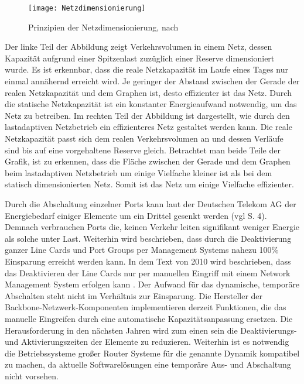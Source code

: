 \begin{figure}[!ht]
	\centering
	\texttt{[image: Netzdimensionierung]}
	\caption{Prinzipien der Netzdimensionierung, nach \cite{fisher}}
	\label{fig:Netzdimensionierung}
\end{figure}

Der linke Teil der Abbildung zeigt Verkehrsvolumen in einem Netz, dessen Kapazität aufgrund einer Spitzenlast zuzüglich einer Reserve dimensioniert wurde. Es ist erkennbar, dass die reale Netzkapazität im Laufe eines Tages nur einmal annähernd erreicht wird. Je geringer der Abstand zwischen der Gerade der realen Netzkapazität und dem Graphen ist, desto effizienter ist das Netz. Durch die statische Netzkapazität ist ein konstanter Energieaufwand notwendig, um das Netz zu betreiben. Im rechten Teil der Abbildung ist dargestellt, wie durch den lastadaptiven Netzbetrieb ein effizienteres Netz gestaltet werden kann. Die reale Netzkapazität passt sich dem realen Verkehrsvolumen an und dessen Verläufe sind bis auf eine vorgehaltene Reserve gleich. Betrachtet man beide Teile der Grafik, ist zu erkennen, dass die Fläche zwischen der Gerade und dem Graphen beim lastadaptiven Netzbetrieb um einige Vielfache kleiner ist als bei dem statisch dimensionierten Netz. Somit ist das Netz um einige Vielfache effizienter.

Durch die Abschaltung einzelner Ports kann laut der Deutschen Telekom AG der Energiebedarf einiger Elemente um ein Drittel gesenkt werden (vgl \cite{lange} S. 4). Demnach verbrauchen Ports die, keinen Verkehr leiten signifikant weniger Energie als solche unter Last. Weiterhin wird beschrieben, dass durch die Deaktivierung ganzer Line Cards und Port Groups per Management Systems nahezu 100\% Einsparung erreicht werden kann. In dem Text von 2010 wird beschrieben, dass das Deaktivieren der Line Cards nur per manuellen Eingriff mit einem Network Management System erfolgen kann \cite{lange}. Der Aufwand für das dynamische, temporäre Abschalten steht nicht im Verhältnis zur Einsparung. Die Hersteller der Backbone-Netzwerk-Komponenten implementieren derzeit Funktionen, die das manuelle Eingreifen durch eine automatische Kapazitätsanpassung ersetzen. Die Herausforderung in den nächsten Jahren wird zum einen sein die Deaktivierungs- und Aktivierungszeiten der Elemente zu reduzieren. Weiterhin ist es notwendig die Betriebssysteme großer Router Systeme für die genannte Dynamik kompatibel zu machen, da aktuelle Softwarelösungen eine temporäre Aus- und Abschaltung nicht vorsehen.

